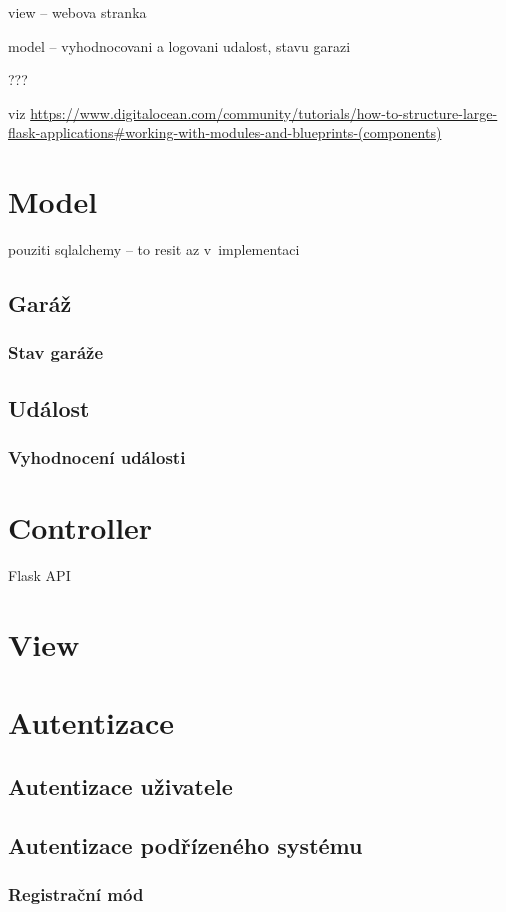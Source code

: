view -- webova stranka

model -- vyhodnocovani a logovani udalost, stavu garazi

???

viz \url{https://www.digitalocean.com/community/tutorials/how-to-structure-large-flask-applications#working-with-modules-and-blueprints-(components)}

\section{Model}

pouziti sqlalchemy -- to resit az v~implementaci

\subsection{Garáž}

\subsubsection{Stav garáže}

\subsection{Událost}

\subsubsection{Vyhodnocení události}

\section{Controller}

Flask API

\section{View}

\section{Autentizace}

\subsection{Autentizace uživatele}

\subsection{Autentizace podřízeného systému}

\subsubsection{Registrační mód}

